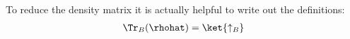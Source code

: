 To reduce the density matrix it is actually helpful to write out the definitions:
\begin{align}
\Tr_B(\rhohat) = \ket{\uparrow_B}
\end{align}
